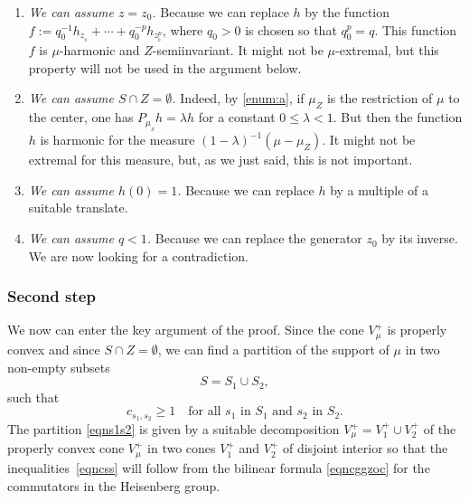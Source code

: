 \documentclass[JEP,XML,SOM,Unicode]{cedram}
\newenvironment{enumeratea}
{\bgroup\def\theenumi{\alph{enumi}}\begin{enumerate}}
{\end{enumerate}\egroup}
\theoremstyle{definition}
\let\la\lambda
\begin{document}
\begin{enumeratea}
\item\label{enum:a}
\emph{We can assume $z=z_0$.}
Because we can replace $h$ by
the function $f:= q_0^{-1}h_{z_{_0}} +\cdots + q_0^{-p}h_{z_{_0}^{p}}$,
where $q_0>0$ is chosen so that $q_0^p=q$. This function $f$ is
$\mu$-harmonic and $Z$-semiinvariant. It might not be $\mu$-extremal,
but this property will not be used in the argument below.

\item
\emph{We can assume $S\cap Z=\emptyset$.} Indeed, by \eqref{enum:a}, if $\mu_Z$ is the restriction of
$\mu$ to the center, one has $P_{\mu_{_Z}}h=\la h$ for a constant $0\leq \la <1$.
But then the function $h$ is harmonic for the measure $(1-\la)^{-1}(\mu-\mu_Z)$.
It might not be extremal for this measure,
but, as we just said, this is not important.

\item
\emph{We can assume $h(0)= 1$.}
Because we can replace $h$ by a multiple of a suitable translate.

\item
\emph{We can assume $q< 1$.} Because we can replace the generator $z_0$
by its inverse. We are now looking for a contradiction.
\end{enumeratea}

\subsubsection*{Second step}
We now can enter the key argument of the proof.
Since the cone $V_\mu^+$ is properly convex and since $S\cap Z=\emptyset$,
we can find a partition of the support of $\mu$ in two non-empty subsets
\begin{equation}
\label{eqns1s2}
S=S_1\cup S_2,
\end{equation}
such that
\begin{equation}
\label{eqncss}
c_{s_1,s_2}\geq 1\quad
\text{for all $s_1$ in $S_1$ and $s_2$ in $S_2$.}
\end{equation}
The partition \eqref{eqns1s2} is given by a suitable decomposition
$V_\mu^+=V_1^+\cup V_2^+$ of the properly convex cone $V_\mu^+$
in two cones $V_1^+$ and $V_2^+$ of disjoint interior so that
the inequalities~\eqref{eqncss} will follow from the bilinear formula \eqref{eqncggzoc}
for the commutators in the Heisenberg group.
\end{document}
